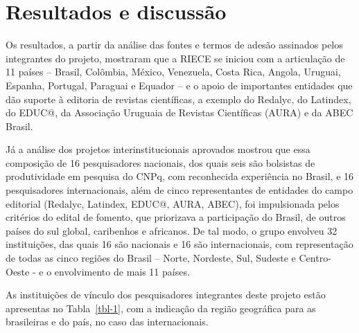 \documentclass[
  a4paper,
]{book}
\begin{document}
\section{Resultados e discussão}\label{resultados-e-discussuxe3o}

Os resultados, a partir da análise das fontes e termos de adesão
assinados pelos integrantes do projeto, mostraram que a RIECE se iniciou
com a articulação de 11 países -- Brasil, Colômbia, México, Venezuela,
Costa Rica, Angola, Uruguai, Espanha, Portugal, Paraguai e Equador -- e
o apoio de importantes entidades que dão suporte à editoria de revistas
científicas, a exemplo do Redalyc, do Latindex, do EDUC@, da Associação
Uruguaia de Revistas Científicas (AURA) e da ABEC Brasil.

Já a análise dos projetos interinstitucionais aprovados mostrou que essa
composição de 16 pesquisadores nacionais, dos quais seis são bolsistas
de produtividade em pesquisa do CNPq, com reconhecida experiência no
Brasil, e 16 pesquisadores internacionais, além de cinco representantes
de entidades do campo editorial (Redalyc, Latindex, EDUC@, AURA, ABEC),
foi impulsionada pelos critérios do edital de fomento, que priorizava a
participação do Brasil, de outros países do sul global, caribenhos e
africanos. De tal modo, o grupo envolveu 32 instituições, das quais 16
são nacionais e 16 são internacionais, com representação de todas as
cinco regiões do Brasil -- Norte, Nordeste, Sul, Sudeste e Centro-Oeste
- e o envolvimento de mais 11 países.

As instituições de vínculo dos pesquisadores integrantes deste projeto
estão apresentas no Tabla~\ref{tbl-1}, com a indicação da região
geográfica para as brasileiras e do país, no caso das internacionais.
\end{document}
